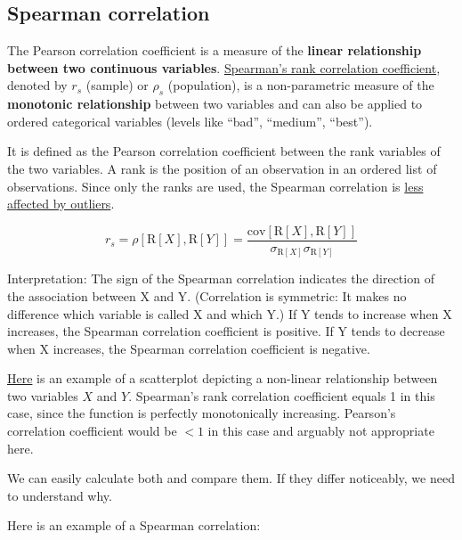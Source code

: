 \documentclass[
]{book}
\begin{document}
\subsection{Spearman correlation}\label{spearman-correlation}

The Pearson correlation coefficient is a measure of the \textbf{linear relationship between two continuous variables}.
\href{https://en.wikipedia.org/wiki/Spearman\%27s_rank_correlation_coefficient}{Spearman's rank correlation coefficient},
denoted by \(r_s\) (sample) or \(\rho_s\) (population), is a non-parametric measure
of the \textbf{monotonic relationship} between two variables and can also be applied to ordered categorical variables
(levels like ``bad'', ``medium'', ``best'').

It is defined as the Pearson correlation coefficient between the rank variables of the two variables.
A rank is the position of an observation in an ordered list of observations. Since only the ranks are used,
the Spearman correlation is \href{https://en.wikipedia.org/wiki/Spearman\%27s_rank_correlation_coefficient\#/media/File:Spearman_fig3.svg}{less affected by outliers}.

\[ r_s = \rho\left[\mathrm{R}[X], \mathrm{R}[Y]\right] = 
\frac{\mathrm{cov}\left[\mathrm{R}[X], \mathrm{R}[Y]\right]}
{\sigma_{\mathrm{R}[X]} \sigma_{\mathrm{R}[Y]}} \]

Interpretation: The sign of the Spearman correlation indicates the direction of
the association between X and Y. (Correlation is symmetric: It makes no difference which variable is called X and which Y.)
If Y tends to increase when X increases, the Spearman correlation coefficient is
positive. If Y tends to decrease when X increases, the Spearman correlation
coefficient is negative.

\href{https://en.wikipedia.org/wiki/Spearman\%27s_rank_correlation_coefficient\#/media/File:Spearman_fig1.svg}{Here}
is an example of a scatterplot depicting a non-linear relationship between two variables \(X\) and \(Y\).
Spearman's rank correlation coefficient equals 1 in this case, since the function is perfectly monotonically increasing.
Pearson's correlation coefficient would be \(<1\) in this case and arguably not appropriate here.

We can easily calculate both and compare them. If they differ noticeably, we need to understand why.

Here is an example of a Spearman correlation:
\end{document}
